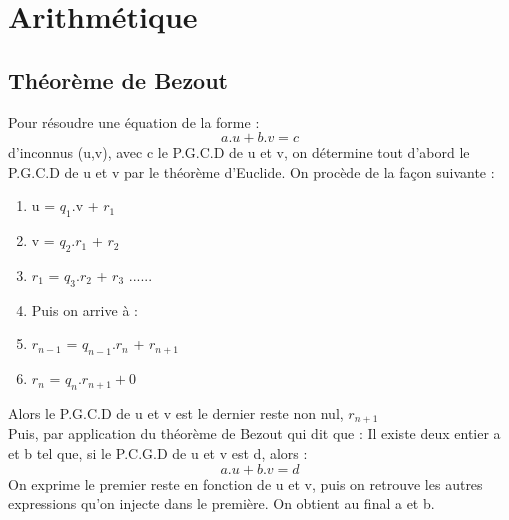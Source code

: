 \chapter{Arithmétique}
\section{Théorème de Bezout}
Pour résoudre une équation de la forme : 
$$a.u+b.v = c$$ 
d'inconnus (u,v), avec c le P.G.C.D de u et v, on détermine tout d'abord le P.G.C.D de u et v par le théorème d'Euclide. On procède de la façon suivante : 
\begin{enumerate}[1-]
 \item u = $q_1$.v + $r_1$
 \item v = $q_2$.$r_1$ + $r_2$
 \item $r_1$ = $q_3$.$r_2$ + $r_3$ ......
 \item Puis on arrive à : 
 \item $r_{n-1}$ = $q_{n-1}$.$r_n$ + $r_{n+1}$
 \item $r_n$ = $q_n.r_{n+1} + 0$
\end{enumerate}
Alors le P.G.C.D de u et v est le dernier reste non nul, $r_{n+1}$\\
Puis, par application du théorème de Bezout qui dit que : Il existe deux entier a et b tel que, si le P.C.G.D de u et v est d, alors : 
$$a.u+b.v = d$$
On exprime le premier reste en fonction de u et v, puis on retrouve les autres expressions qu'on injecte dans le première. On obtient au final a et b.